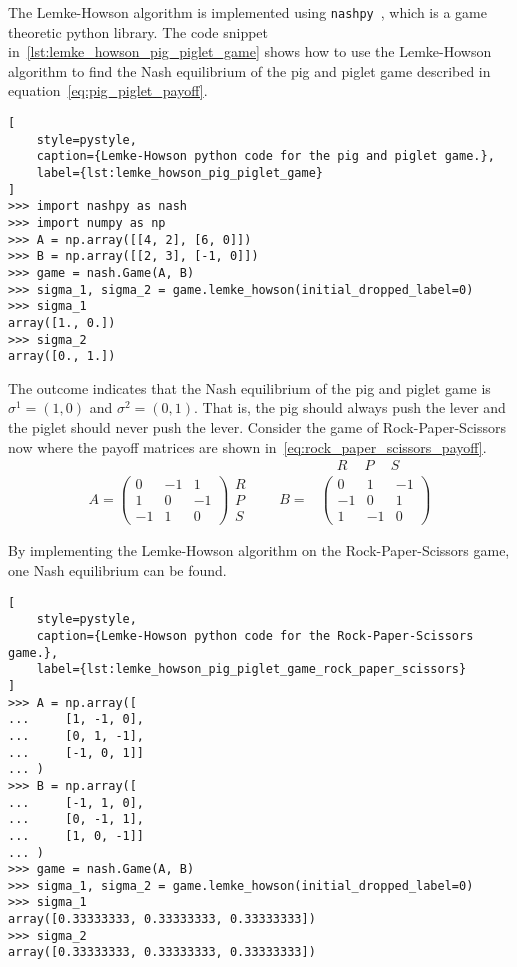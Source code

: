 The Lemke-Howson algorithm is implemented using
\texttt{nashpy}~\cite{thenashpyproject}, which is a game theoretic python
library.
The code snippet in~\ref{lst:lemke_howson_pig_piglet_game} shows how to use the Lemke-Howson
algorithm to find the Nash equilibrium of the pig and piglet game described in
equation~\eqref{eq:pig_piglet_payoff}.

\begin{lstlisting}[
    style=pystyle,
    caption={Lemke-Howson python code for the pig and piglet game.},
    label={lst:lemke_howson_pig_piglet_game}
]
>>> import nashpy as nash
>>> import numpy as np
>>> A = np.array([[4, 2], [6, 0]])
>>> B = np.array([[2, 3], [-1, 0]])
>>> game = nash.Game(A, B)
>>> sigma_1, sigma_2 = game.lemke_howson(initial_dropped_label=0)
>>> sigma_1
array([1., 0.])
>>> sigma_2
array([0., 1.])

\end{lstlisting}

The outcome indicates that the Nash equilibrium of the pig and piglet game is
\(\sigma^1 = (1,0)\) and \(\sigma^2 = (0,1)\).
That is, the pig should always push the lever and the piglet should never push
the lever.
Consider the game of Rock-Paper-Scissors now where the payoff matrices are
shown in~\eqref{eq:rock_paper_scissors_payoff}.
\begin{align}
    & \quad \ R \quad \ P \quad \ S \nonumber \\
    A =
    \begin{pmatrix}
        0 & -1 & 1 \\
        1 & 0 & -1 \\
        -1 & 1 & 0
    \end{pmatrix}
    \begin{matrix}
        R \\
        P \\
        S
    \end{matrix} \qquad
    B = &
    \begin{pmatrix}
        0 & 1 & -1 \\
        -1 & 0 & 1 \\
        1 & -1 & 0
    \end{pmatrix}
    \label{eq:rock_paper_scissors_payoff}
\end{align}

By implementing the Lemke-Howson algorithm on the Rock-Paper-Scissors game, one
Nash equilibrium can be found.

\begin{lstlisting}[
    style=pystyle,
    caption={Lemke-Howson python code for the Rock-Paper-Scissors game.},
    label={lst:lemke_howson_pig_piglet_game_rock_paper_scissors}
]
>>> A = np.array([
...     [1, -1, 0],
...     [0, 1, -1],
...     [-1, 0, 1]]
... )
>>> B = np.array([
...     [-1, 1, 0], 
...     [0, -1, 1],
...     [1, 0, -1]]
... )
>>> game = nash.Game(A, B)
>>> sigma_1, sigma_2 = game.lemke_howson(initial_dropped_label=0)
>>> sigma_1
array([0.33333333, 0.33333333, 0.33333333])
>>> sigma_2
array([0.33333333, 0.33333333, 0.33333333])

\end{lstlisting}


